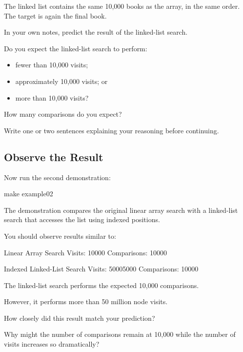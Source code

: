\documentclass{csc2059practical}
\begin{document}
The linked list contains the same 10,000 books as the array, in the same order.
The target is again the final book.

In your own notes, predict the result of the linked-list search.

\begin{reflectionbox}
Do you expect the linked-list search to perform:

\begin{itemize}
    \item fewer than 10,000 visits;
    \item approximately 10,000 visits; or
    \item more than 10,000 visits?
\end{itemize}

How many comparisons do you expect?

Write one or two sentences explaining your reasoning before continuing.
\end{reflectionbox}


\subsection{Observe the Result}

Now run the second demonstration:

\begin{terminal}
make example02
\end{terminal}

The demonstration compares the original linear array search with a linked-list
search that accesses the list using indexed positions.

You should observe results similar to:

\begin{terminal}
Linear Array Search
Visits: 10000
Comparisons: 10000

Indexed Linked-List Search
Visits: 50005000
Comparisons: 10000
\end{terminal}

The linked-list search performs the expected 10,000 comparisons.

However, it performs more than 50 million node visits.

\begin{reflectionbox}
How closely did this result match your prediction?

Why might the number of comparisons remain at 10,000 while the number of visits
increases so dramatically?
\end{reflectionbox}
\end{document}
